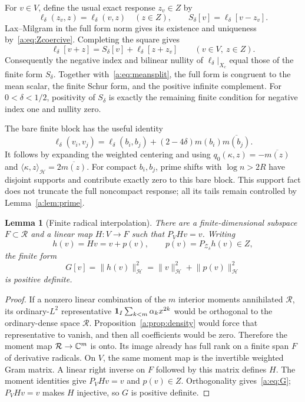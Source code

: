 \documentclass[11pt,a4paper]{article}
\numberwithin{equation}{section}
\newtheorem{lemma}[theorem]{Lemma}
\theoremstyle{definition}\newtheorem{definition}[theorem]{Definition}
\theoremstyle{remark}\newtheorem{remark}[theorem]{Remark}
\newcommand{\Hh}{\mathcal H}\newcommand{\Hw}{\mathcal H}
\newcommand{\ip}[2]{\langle#1,#2\rangle}\newcommand{\norm}[1]{\lVert#1\rVert}\newcommand{\abs}[1]{\lvert#1\rvert}
\newcommand{\Zc}{\mathcal Z_\delta}\newcommand{\Rcal}{\mathcal R}
\begin{document}
For $v\in V$, define the usual exact response $z_v\in Z$ by
\begin{equation}\label{a:eq:usualresponse}
 \ell_\delta(z_v,z)=\ell_\delta(v,z)\quad(z\in Z),\qquad
 S_\delta[v]=\ell_\delta[v-z_v].
\end{equation}
Lax--Milgram in the full form norm gives its existence and uniqueness by~\eqref{a:eq:Zcoercive}. Completing the square gives
\begin{equation}\label{a:eq:usualsquare}
 \ell_\delta[v+z]=S_\delta[v]+\ell_\delta[z+z_v]
                         \qquad(v\in V,\ z\in Z).
\end{equation}
Consequently the negative index and bilinear nullity of $\ell_\delta|_{X_c}$ equal those of the finite form $S_\delta$. Together with~\eqref{a:eq:meansplit}, the full form is congruent to the mean scalar, the finite Schur form, and the positive infinite complement. For $0<\delta<1/2$, positivity of $S_\delta$ is exactly the remaining finite condition for negative index one and nullity zero.

The bare finite block has the useful identity
\begin{equation}\label{a:eq:bareblock}
 \ell_\delta(v_i,v_j)=\ell_\delta(b_i,b_j)
       +(2-4\delta)m(b_i)\overline{m(b_j)}.
\end{equation}
It follows by expanding the weighted centering and using
$q_0(\kappa,z)=-\overline{m(z)}$ and
$\ip\kappa z_{\Hh}=2\overline{m(z)}$.
For compact $b_i,b_j$, prime shifts with $\log n>2R$ have disjoint supports and contribute exactly zero to this bare block. This support fact does not truncate the full noncompact response; all its tails remain controlled by Lemma~\ref{a:lem:prime}.

\begin{lemma}[Finite radical interpolation]\label{a:lem:lift}
There are a finite-dimensional subspace $F\subset\Rcal$ and a linear map $H:V\to F$ such that $P_VHv=v$. Writing
\begin{equation}\label{a:eq:liftdata}
 h(v)=Hv=v+p(v),\qquad p(v)=P_{\Zc}h(v)\in Z,
\end{equation}
the finite form
\begin{equation}\label{a:eq:G}
 G[v]=\norm{h(v)}_{\Hh}^2
     =\norm v_{\Hh}^2+\norm{p(v)}_{\Hh}^2
\end{equation}
is positive definite.
\end{lemma}
\begin{proof}
If a nonzero linear combination of the $m$ interior moments annihilated $\Rcal$, its ordinary-$L^2$ representative
$\mathbf1_I\sum_{k<m}\alpha_kx^{2k}$ would be orthogonal to the ordinary-dense space $\Rcal$. Proposition~\ref{a:prop:density} would force that representative to vanish, and then all coefficients would be zero. Therefore the moment map $\Rcal\to\C^m$ is onto. Its image already has full rank on a finite span $F$ of derivative radicals. On $V$, the same moment map is the invertible weighted Gram matrix. A linear right inverse on $F$ followed by this matrix defines $H$. The moment identities give $P_VHv=v$ and $p(v)\in Z$. Orthogonality gives~\eqref{a:eq:G}; $P_VHv=v$ makes $H$ injective, so $G$ is positive definite.
\end{proof}
\end{document}
